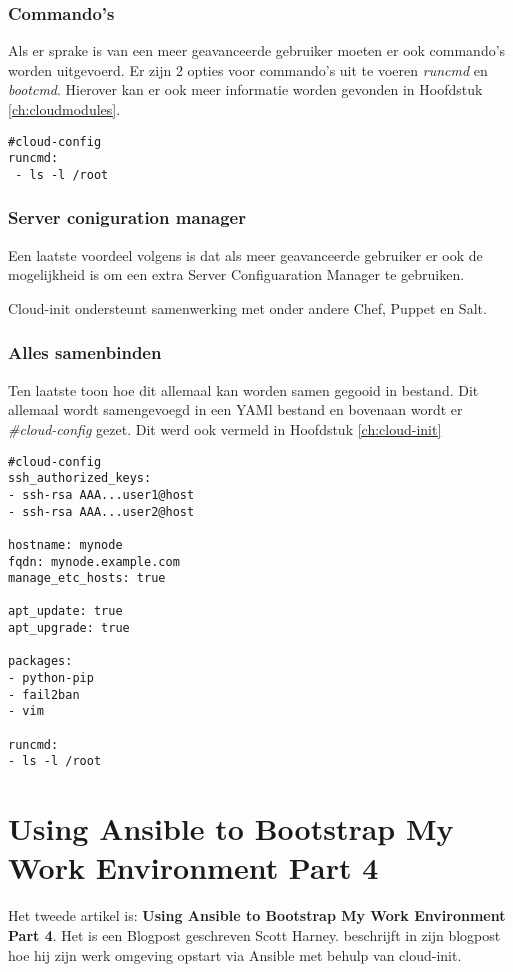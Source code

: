 \subsubsection{Commando's}
Als er sprake is van een meer geavanceerde gebruiker moeten er ook commando's worden uitgevoerd. Er zijn 2 opties voor commando's uit te voeren \textit{runcmd} en \textit{bootcmd}. Hierover kan er ook meer informatie worden gevonden in Hoofdstuk \ref*{ch:cloudmodules}.
\begin{lstlisting}
#cloud-config
runcmd:
 - ls -l /root
\end{lstlisting} 
\subsubsection{Server coniguration manager}
Een laatste voordeel volgens \autocite{viktorpet} is dat als meer geavanceerde gebruiker er ook de mogelijkheid is om een extra Server Configuaration Manager te gebruiken. 

Cloud-init ondersteunt samenwerking met onder andere Chef, Puppet en Salt.
\subsubsection{Alles samenbinden}
Ten laatste toon \autocite{viktorpet} hoe dit allemaal kan worden samen gegooid in bestand. Dit allemaal wordt samengevoegd in een YAMl bestand en bovenaan wordt er \textit{\#cloud-config} gezet. Dit werd ook vermeld in Hoofdstuk \ref*{ch:cloud-init}
\begin{lstlisting}
#cloud-config
ssh_authorized_keys:
- ssh-rsa AAA...user1@host
- ssh-rsa AAA...user2@host

hostname: mynode
fqdn: mynode.example.com
manage_etc_hosts: true

apt_update: true
apt_upgrade: true

packages:
- python-pip
- fail2ban
- vim

runcmd:
- ls -l /root
\end{lstlisting} 

\section{Using Ansible to Bootstrap My Work Environment Part 4}
Het tweede artikel is: \textbf{Using Ansible to Bootstrap My Work Environment Part 4}. Het is een Blogpost geschreven Scott Harney. \autocite{scottharney} beschrijft in zijn blogpost hoe hij zijn werk omgeving opstart via Ansible met behulp van cloud-init. 

